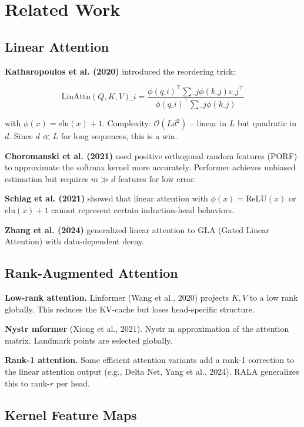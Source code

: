 
\section{Related Work}

\subsection{Linear Attention}

\textbf{Katharopoulos et al. (2020)} introduced the reordering trick:

\[
\text{LinAttn}(Q, K, V)\_i = \frac{\phi(q\_i)^\top \sum\_j \phi(k\_j) v\_j^\top}{\phi(q\_i)^\top \sum\_j \phi(k\_j)}
\tag{2.1}
\]

with $\phi(x) = \mathrm{elu}(x) + 1$. Complexity: $\mathcal{O}(L d^2)$ -- 
linear in $L$ but quadratic in $d$. Since $d \ll L$ for long sequences, 
this is a win.

\textbf{Choromanski et al. (2021)} used positive orthogonal random features 
(PORF) to approximate the softmax kernel more accurately. Performer achieves 
unbiased estimation but requires $m \gg d$ features for low error.

\textbf{Schlag et al. (2021)} showed that linear attention with $\phi(x) = 
\mathrm{ReLU}(x)$ or $\mathrm{elu}(x) + 1$ cannot represent certain 
induction-head behaviors.

\textbf{Zhang et al. (2024)} generalized linear attention to GLA (Gated Linear 
Attention) with data-dependent decay.

\subsection{Rank-Augmented Attention}

\textbf{Low-rank attention.} Linformer (Wang et al., 2020) projects $K, V$ to a 
low rank globally. This reduces the KV-cache but loses head-specific 
structure.

\textbf{Nystr mformer} (Xiong et al., 2021). Nystr m approximation of the attention 
matrix. Landmark points are selected globally.

\textbf{Rank-1 attention.} Some efficient attention variants add a rank-1 
correction to the linear attention output (e.g., Delta Net, Yang et al., 
2024). RALA generalizes this to rank-$r$ per head.

\subsection{Kernel Feature Maps}

